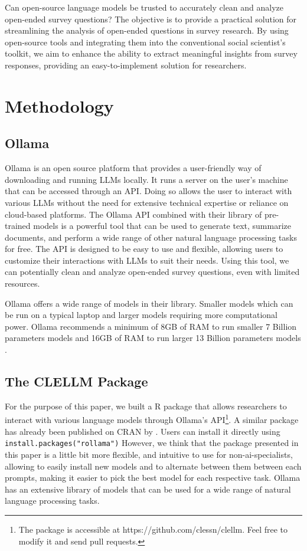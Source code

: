 \documentclass[
  authoryear,
  preprint,
  3p]{elsarticle}
\begin{document}
Can open-source language models be trusted to accurately clean and
analyze open-ended survey questions? The objective is to provide a
practical solution for streamlining the analysis of open-ended questions
in survey research. By using open-source tools and integrating them into
the conventional social scientist's toolkit, we aim to enhance the
ability to extract meaningful insights from survey responses, providing
an easy-to-implement solution for researchers.

\section{Methodology}\label{methodology}

\subsection{Ollama}\label{ollama}

Ollama is an open source platform that provides a user-friendly way of
downloading and running LLMs locally. It runs a server on the user's
machine that can be accessed through an API. Doing so allows the user to
interact with various LLMs without the need for extensive technical
expertise or reliance on cloud-based platforms. The Ollama API combined
with their library of pre-trained models is a powerful tool that can be
used to generate text, summarize documents, and perform a wide range of
other natural language processing tasks for free. The API is designed to
be easy to use and flexible, allowing users to customize their
interactions with LLMs to suit their needs. Using this tool, we can
potentially clean and analyze open-ended survey questions, even with
limited resources.

Ollama offers a wide range of models in their library. Smaller models
which can be run on a typical laptop and larger models requiring more
computational power. Ollama recommends a minimum of 8GB of RAM to run
smaller 7 Billion parameters models and 16GB of RAM to run larger 13
Billion parameters models \citep{ollama24}.

\subsection{The CLELLM Package}\label{the-clellm-package}

For the purpose of this paper, we built a R package that allows
researchers to interact with various language models through Ollama's
API\footnote{The package is accessible at
  https://github.com/clessn/clellm. Feel free to modify it and send pull
  requests.}. A similar package has already been published on CRAN by
\citet{gruber_weber24}. Users can install it directly using
\texttt{install.packages("rollama")} However, we think that the package
presented in this paper is a little bit more flexible, and intuitive to
use for non-ai-specialists, allowing to easily install new models and to
alternate between them between each prompts, making it easier to pick
the best model for each respective task. Ollama has an extensive library
of models that can be used for a wide range of natural language
processing tasks.
\end{document}
